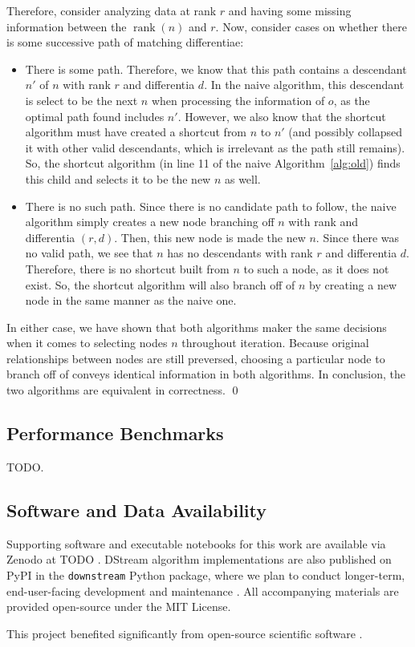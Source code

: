 Therefore, consider analyzing data at rank $r$ and having some missing information between the $\operatorname{rank}(n)$ and $r$. Now, consider cases on whether there is some successive path of matching differentiae:

\begin{itemize}
  \item There is some path. Therefore, we know that this path contains a descendant $n'$ of $n$ with rank $r$ and differentia $d$. In the naive algorithm, this descendant is select to be the next $n$ when processing the information of $o$, as the optimal path found includes $n'$. However, we also know that the shortcut algorithm must have created a shortcut from $n$ to $n'$ (and possibly collapsed it with other valid descendants, which is irrelevant as the path still remains). So, the shortcut algorithm (in line 11 of the naive Algorithm~\ref{alg:old}) finds this child and selects it to be the new $n$ as well.
  \item There is no such path. Since there is no candidate path to follow, the naive algorithm simply creates a new node branching off $n$ with rank and differentia $(r, d)$. Then, this new node is made the new $n$. Since there was no valid path, we see that $n$ has no descendants with rank $r$ and differentia $d$. Therefore, there is no shortcut built from $n$ to such a node, as it does not exist. So, the shortcut algorithm will also branch off of $n$ by creating a new node in the same manner as the naive one. 
\end{itemize}

In either case, we have shown that both algorithms maker the same decisions when it comes to selecting nodes $n$ throughout iteration. Because original relationships between nodes are still preversed, choosing a particular node to branch off of conveys identical information in both algorithms. In conclusion, the two algorithms are equivalent in correctness. \qed

\subsection{Performance Benchmarks}

TODO.

\subsection{Software and Data Availability} \label{sec:materials}



Supporting software and executable notebooks for this work are available via Zenodo at TODO \citep{moreno2024hsurf}.
DStream algorithm implementations are also published on PyPI in the \texttt{downstream} Python package, where we plan to conduct longer-term, end-user-facing development and maintenance \citep{moreno2024downstream}.
All accompanying materials are provided open-source under the MIT License.

This project benefited significantly from open-source scientific software \citep{2020SciPy-NMeth,harris2020array,reback2020pandas,mckinney-proc-scipy-2010,waskom2021seaborn,hunter2007matplotlib,moreno2023teeplot}.
